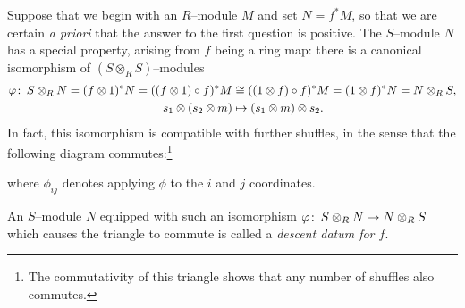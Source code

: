 Suppose that we begin with an $R$--module $M$ and set $N = f^* M$, so that we are certain \emph{a priori} that the answer to the first question is positive.  The $S$--module $N$ has a special property, arising from $f$ being a ring map: there is a canonical isomorphism of $(S \otimes_R S)$--modules
\begin{align*}
\varphi\colon\thinspace S \otimes_R N = (f \otimes 1)^* N = ((f \otimes 1) \circ f)^* M & \cong ((1 \otimes f) \circ f)^* M = (1 \otimes f)^* N = N \otimes_R S, \\
s_1 \otimes (s_2 \otimes m) & \mapsto (s_1 \otimes m) \otimes s_2.
\end{align*}
In fact, this isomorphism is compatible with further shuffles, in the sense that the following diagram commutes:\footnote{The commutativity of this triangle shows that any number of shuffles also commutes.}
\begin{center}
\end{center}
where $\phi_{ij}$ denotes applying $\phi$ to the $i${\th} and $j${\th} coordinates.

\begin{definition}
An $S$--module $N$ equipped with such an isomorphism $\varphi\colon\thinspace S \otimes_R N \to N \otimes_R S$ which causes the triangle to commute is called a \textit{descent datum for $f$}.
\end{definition}

